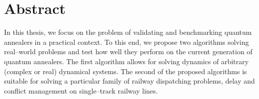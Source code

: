 \chapter*{Abstract}

In this thesis, we focus on the problem of validating and benchmarking quantum annealers in a practical context. To this end, we propose two algorithms solving real--world problems and test how well they perform on the current generation of quantum annealers. The first algorithm allows for solving dynamics of arbitrary (complex or real) dynamical systems. The second of the proposed algorithms is suitable for solving a particular family of railway dispatching problems, delay and conflict management on single--track railway lines.

